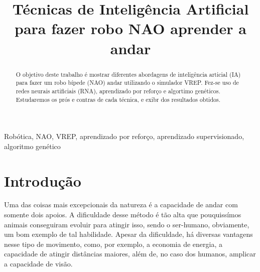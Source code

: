 \documentclass[twoside,conference,a4paper]{IEEEtran}
\begin{document}
\renewcommand{\IEEEkeywordsname}{Palavras-chave}


\title{Técnicas de Inteligência Artificial para fazer robo NAO aprender a andar}
\author{%
}


\maketitle

\begin{abstract}
O objetivo deste trabalho é mostrar diferentes abordagens de inteligência articial (IA) para fazer um robo bípede (NAO) andar utilizando o simulador VREP. Fez-se uso de redes neurais artificiais (RNA), aprendizado por reforço e algortimo genéticos. Estudaremos os prós e contras de cada técnica, e exibr dos resultados obtidos.
\end{abstract}

\begin{IEEEkeywords}
 Robótica, NAO, VREP, aprendizado por reforço, aprendizado supervisionado, algoritmo genético
\end{IEEEkeywords}


\section{Introdução}

Uma das coisas mais excepcionais da natureza é a capacidade de andar com somente dois apoios. A dificuldade desse método é tão alta que pouquissímos animais conseguiram evoluir para atingir isso, sendo o ser-humano, obviamente, um bom exemplo de tal habilidade. Apesar da dificuldade, há diversas vantagens nesse tipo de movimento, como, por exemplo, a economia de energia, a capacidade de atingir distâncias maiores, além de, no caso dos humanos, amplicar a capacidade de visão.
\end{document}

